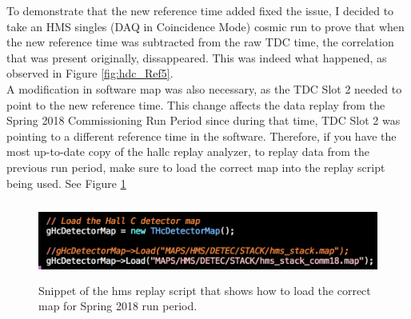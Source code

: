 \documentclass[11pt]{article}
\begin{document}
\noindent To demonstrate that the new reference time added fixed the issue, I decided to take an HMS singles (DAQ in Coincidence Mode) cosmic run to prove that when the
new reference time was subtracted from the raw TDC time, the correlation that was present originally, dissappeared. This was indeed what happened, as observed in Figure \ref{fig:hdc_Ref5}.\\
\indent A modification in software map was also necessary, as the TDC Slot 2 needed to point to the new reference time. This change affects the data replay from the
Spring 2018 Commissioning Run Period since during that time, TDC Slot 2 was pointing to a different reference time in the software. Therefore, if you have the most up-to-date copy of the
hallc replay analyzer, to replay data from the previous run period, make sure to load the correct map into the replay script being used. See Figure \ref{fig:map} 

\begin{figure}[h]
  \centering
  \includegraphics[width=5.0in, height=1.0in]{loadmap.png}
  \caption{Snippet of the hms replay script that shows how to load the correct map for Spring 2018 run period.}
  \label{fig:map}
\end{figure}
\newpage
\end{document}
